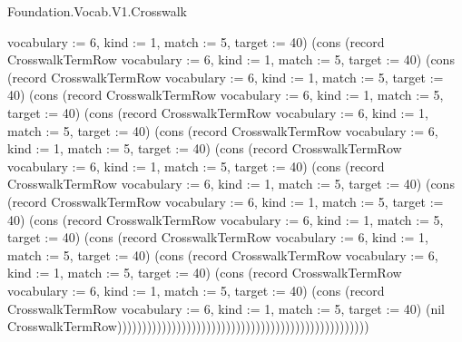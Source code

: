 \begin{lexlean}{Foundation.Vocab.V1.Crosswalk}
\begin{semanticmodule}
{{vocabulary := 6, kind := 1, match := 5, target := 40}) (cons (record CrosswalkTermRow {vocabulary := 6, kind := 1, match := 5, target := 40}) (cons (record CrosswalkTermRow {vocabulary := 6, kind := 1, match := 5, target := 40}) (cons (record CrosswalkTermRow {vocabulary := 6, kind := 1, match := 5, target := 40}) (cons (record CrosswalkTermRow {vocabulary := 6, kind := 1, match := 5, target := 40}) (cons (record CrosswalkTermRow {vocabulary := 6, kind := 1, match := 5, target := 40}) (cons (record CrosswalkTermRow {vocabulary := 6, kind := 1, match := 5, target := 40}) (cons (record CrosswalkTermRow {vocabulary := 6, kind := 1, match := 5, target := 40}) (cons (record CrosswalkTermRow {vocabulary := 6, kind := 1, match := 5, target := 40}) (cons (record CrosswalkTermRow {vocabulary := 6, kind := 1, match := 5, target := 40}) (cons (record CrosswalkTermRow {vocabulary := 6, kind := 1, match := 5, target := 40}) (cons (record CrosswalkTermRow {vocabulary := 6, kind := 1, match := 5, target := 40}) (cons (record CrosswalkTermRow {vocabulary := 6, kind := 1, match := 5, target := 40}) (cons (record CrosswalkTermRow {vocabulary := 6, kind := 1, match := 5, target := 40}) (nil CrosswalkTermRow)))))))))))))))))))))))))))))))))))))))))))))))))))
}


\end{semanticmodule}
\end{lexlean}
